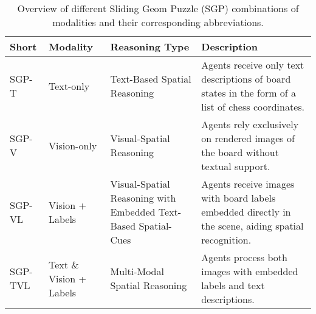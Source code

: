 \begin{table*}[t]
\caption{Overview of different Sliding Geom Puzzle (SGP) combinations of modalities and their corresponding abbreviations. }
\label{tab:sgp_modalities}
\centering
\begin{tabular}{p{1.5cm} p{2.5cm} p{4.5cm} p{7cm}}
\toprule
\textbf{Short} & \textbf{Modality} & \textbf{Reasoning Type} & \textbf{Description} \\
\midrule
SGP-T & Text-only & Text-Based Spatial Reasoning & Agents receive only text descriptions of board states in the form of a list of chess coordinates. \\
SGP-V & Vision-only & Visual-Spatial Reasoning & Agents rely exclusively on rendered images of the board without textual support. \\
SGP-VL & Vision + Labels & Visual-Spatial Reasoning with Embedded Text-Based Spatial-Cues & Agents receive images with board labels embedded directly in the scene, aiding spatial recognition. \\
SGP-TVL & Text \& Vision + Labels & Multi-Modal Spatial Reasoning & Agents process both images with embedded labels and text descriptions. \\
\bottomrule
\end{tabular}
\end{table*}